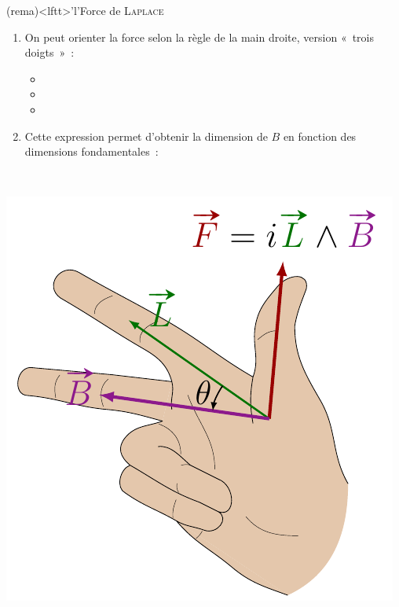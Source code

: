 \documentclass[../../main/main.tex]{subfiles}
\begin{document}
\begin{tcb}(rema)<lftt>'l'{Force de \textsc{Laplace}}
	\begin{minipage}[t]{.68\linewidth}
		\begin{enumerate}
			\item On peut orienter la force selon la règle de la main droite, version
			      «~trois doigts~»~:
			      \begin{itemize}
				      \item {}%
				      \item {}%
				      \item {}%
			      \end{itemize}
			\item Cette expression permet d'obtenir la dimension de $B$ en fonction des
			      dimensions fondamentales~:
			      \psw{%
				      \[
					      B = \frac{F}{\ell i} \Lra [B]
					      = \frac{\rm M \cdot L \cdot T^{-2}}{\rm L \cdot I}
					      = \mathrm{M \cdot T^{-2} \cdot I^{-1}}
				      \]
			      }%
		\end{enumerate}
	\end{minipage}
	\hfill
	\begin{minipage}[t]{.30\linewidth}
		~
		\vspace*{-20pt}
		\begin{center}
			\includegraphics[width=\linewidth]{righthand_laplace}

\end{center}
\end{minipage}
\end{tcb}
\end{document}

